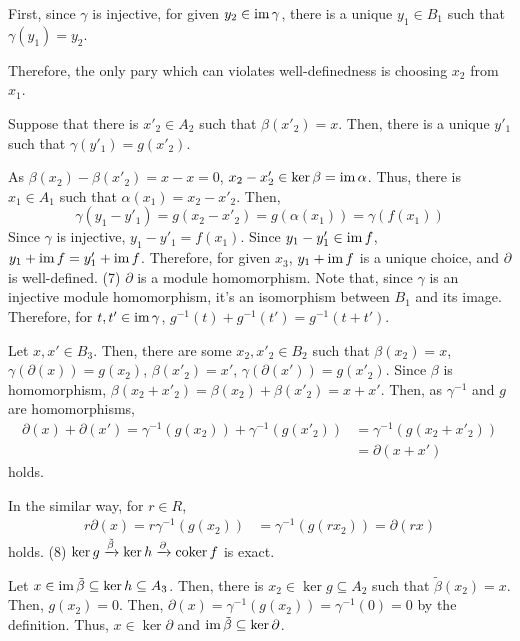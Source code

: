 First, since \(\gamma\) is injective, for given \(y_2 \in \textnormal{im}\, \gamma\), there is a unique \(y_1 \in B_1\) such that \(\gamma(y_1) = y_2\).

Therefore, the only pary which can violates well-definedness is choosing \(x_2\) from \(x_1\).

Suppose that there is \(x'_2 \in A_2\) such that \(\beta(x'_2) = x\).
Then, there is a unique \(y'_1\) such that \(\gamma(y'_1) = g(x'_2)\).

As \(\beta(x_2) - \beta(x'_2) = x - x = 0\), \(x_2 - x'_2 \in \ker \beta = \textnormal{im}\, \alpha\).
Thus, there is \(x_1 \in A_1\) such that \(\alpha(x_1) = x_2 - x'_2\).
Then,
\[\gamma(y_1 - y'_1) = g(x_2 - x'_2) = g(\alpha(x_1)) = \gamma(f(x_1))\]
Since \(\gamma\) is injective, \(y_1 - y'_1 = f(x_1)\).
Since \(y_1 - y'_1 \in \textnormal{im}\, f\), \(y_1 + \textnormal{im}\, f = y'_1 + \textnormal{im}\, f\).
Therefore, for given \(x_3\), \(y_1 + \textnormal{im}\, f\) is a unique choice,
and \(\partial\) is well-defined.
\br
\noindent
(7) \(\partial\) is a module homomorphism.
Note that, since \(\gamma\) is an injective module homomorphism, it's an isomorphism between \(B_1\) and its image.
Therefore, for \(t, t' \in \textnormal{im}\, \gamma\), \(g^{-1}(t) + g^{-1}(t') = g^{-1}(t + t')\).

Let \(x, x' \in B_3\). Then, there are some \(x_2, x'_2 \in B_2\) such that \(\beta(x_2) = x\), \(\gamma(\partial(x)) = g(x_2)\), \(\beta(x'_2) = x'\), \(\gamma(\partial(x')) = g(x'_2)\).
Since \(\beta\) is homomorphism, \(\beta(x_2 + x'_2) = \beta(x_2) + \beta(x'_2) = x + x'\).
Then, as \(\gamma^{-1}\) and \(g\) are homomorphisms,
\begin{align*}
  \partial(x) + \partial(x')
  = \gamma^{-1}(g(x_2)) + \gamma^{-1}(g(x'_2))
  &= \gamma^{-1}(g(x_2 + x'_2))
  \\&= \partial(x + x')
\end{align*}
holds.

In the similar way, for \(r \in R\),
\begin{align*}
  r\partial(x)
  = r\gamma^{-1}(g(x_2))
  &= \gamma^{-1}(g(rx_2))
  = \partial(rx)
\end{align*}
holds.
\br
\noindent
(8) \(\ker g \xrightarrow{\tilde\beta} \ker h \xrightarrow{\partial} \textnormal{coker}\, f\) is exact.

Let \(x \in \textnormal{im}\,\tilde\beta \subseteq \ker h \subseteq A_3\).
Then, there is \(x_2 \in \ker g \subseteq A_2\)
such that \(\tilde\beta(x_2) = x\).
Then, \(g(x_2) = 0\).
Then, \(\partial(x) = \gamma^{-1}(g(x_2)) = \gamma^{-1}(0) = 0\) by the definition.
Thus, \(x \in \ker\partial\) and \(\textnormal{im}\,\tilde\beta \subseteq \ker\partial\).

